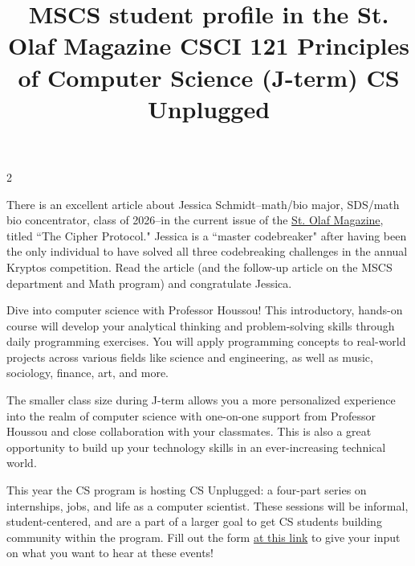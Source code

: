 \documentclass[12pt]{article}
\newcommand{\bolder}{\textbf}
\begin{document}
\begin{multicols}{2}
\begin{tcolorbox}[colback=white, colframe=black]
    \begin{center}
    \title{{\large \bolder{MSCS student profile in the St. Olaf Magazine
}}}
    \end{center}
\end{tcolorbox}

There is an excellent article about Jessica Schmidt--math/bio major, SDS/math bio concentrator, class of 2026--in the current issue of the \href{https://wp.stolaf.edu/magazine/}{St. Olaf Magazine}, titled ``The Cipher Protocol." Jessica is a ``master codebreaker" after having been the only individual to have solved all three codebreaking challenges in the annual Kryptos competition. Read the article (and the follow-up article on the MSCS department and Math program) and congratulate Jessica.

\begin{tcolorbox}[colback=white, colframe=black]
    \begin{center}
    \title{{\large \bolder{CSCI 121 Principles of Computer Science (J-term)
}}}
    \end{center}
\end{tcolorbox}

Dive into computer science with Professor Houssou! This introductory, hands-on course will develop your analytical thinking and problem-solving skills through daily programming exercises. You will apply programming concepts to real-world projects across various fields like science and engineering, as well as music, sociology, finance, art, and more. 

The smaller class size during J-term allows you a more personalized experience into the realm of computer science with one-on-one support from Professor Houssou and close collaboration with your classmates. This is also a great opportunity to build up your technology skills in an ever-increasing technical world.

\begin{tcolorbox}[colback=white, colframe=black]
    \begin{center}
    \title{{\large \bolder{ CS Unplugged   }}}
    \end{center}
\end{tcolorbox}

This year the CS program is hosting CS Unplugged: a four-part series on internships, jobs, and life as a computer scientist. These sessions will be informal, student-centered, and are a part of a larger goal to get CS students building community within the program. Fill out the form \href{https://docs.google.com/forms/d/e/1FAIpQLScfAnexFhdd-ZAHY0RDX8MpB6A7D7cFtjFYITs-VHnXKzg8XQ/viewform}{at this link} to give your input on what you want to hear at these events!


\end{multicols}
\end{document}
